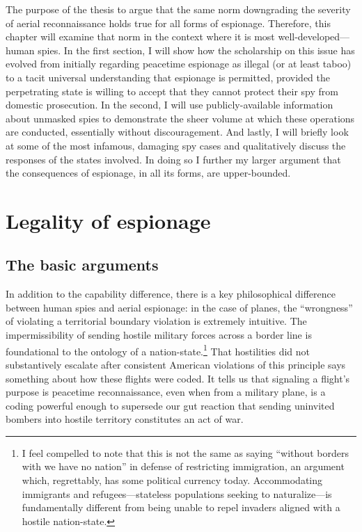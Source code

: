 \documentclass[12pt]{article}
\begin{document}
The purpose of the thesis to argue that the same norm downgrading the severity of aerial reconnaissance holds true for all forms of espionage. Therefore, this chapter will examine that norm in the context where it is most well-developed---human spies. In the first section, I will show how the scholarship on this issue has evolved from initially regarding peacetime espionage as illegal (or at least taboo) to a tacit universal understanding that espionage is permitted, provided the perpetrating state is willing to accept that they cannot protect their spy from domestic prosecution. In the second, I will use publicly-available information about unmasked spies to demonstrate the sheer volume at which these operations are conducted, essentially without discouragement. And lastly, I will briefly look at some of the most infamous, damaging spy cases and qualitatively discuss the responses of the states involved. In doing so I further my larger argument that the consequences of espionage, in all its forms, are upper-bounded.

\section{Legality of espionage}
\subsection{The basic arguments}
In addition to the capability difference, there is a key philosophical difference between human spies and aerial espionage: in the case of planes, the ``wrongness'' of violating a territorial boundary violation is extremely intuitive. The impermissibility of sending hostile military forces across a border line is foundational to the ontology of a nation-state.\footnote{I feel compelled to note that this is not the same as saying ``without borders with we have no nation'' in defense of restricting immigration, an argument which, regrettably, has some political currency today. Accommodating immigrants and refugees---stateless populations seeking to naturalize---is fundamentally different from being unable to repel invaders aligned with a hostile nation-state.} That hostilities did not substantively escalate after consistent American violations of this principle says something about how these flights were coded. It tells us that signaling a flight's purpose is peacetime reconnaissance, even when from a military plane, is a coding powerful enough to supersede our gut reaction that sending uninvited bombers into hostile territory constitutes an act of war.
\end{document}
